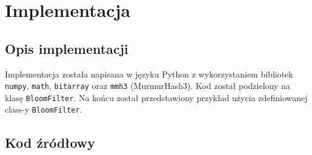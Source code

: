 \documentclass{article}
\begin{document}
\newpage

\section{Implementacja}

\subsection{Opis implementacji}

Implementacja została napisana w języku Python z wykorzystaniem bibliotek \texttt{numpy}, \texttt{math}, \texttt{bitarray} oraz \texttt{mmh3} (MurmurHash3). Kod został podzielony na klasę \texttt{BloomFilter}. Na końcu został przedstawiony przykład użycia zdefiniowanej class-y \texttt{BloomFilter}.

\subsection{Kod źródłowy}
\end{document}
